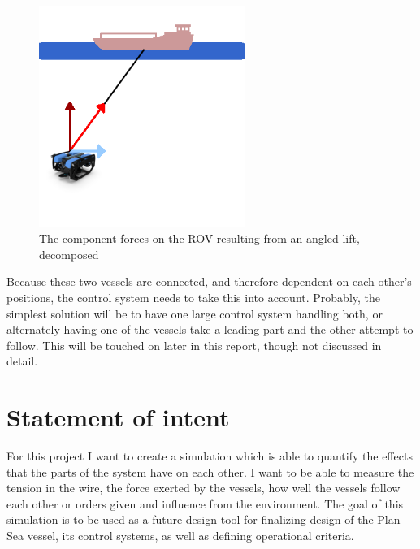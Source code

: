 \documentclass[class=article, crop=false]{standalone}
\begin{document}
\begin{figure}
	\centering
	\includegraphics[width=0.6\textwidth]{angled-component}
	\caption{The component forces on the ROV resulting from an angled lift, decomposed}
	\label{fig:angled-force}
\end{figure}

Because these two vessels are connected, and therefore dependent on each other's positions, the control system needs to take this into account. Probably, the simplest solution will be to have one large control system handling both, or alternately having one of the vessels take a leading part and the other attempt to follow. This will be touched on later in this report, though not discussed in detail.

\section{Statement of intent}
For this project I want to create a simulation which is able to quantify the effects that the parts of the system have on each other. I want to be able to measure the tension in the wire, the force exerted by the vessels, how well the vessels follow each other or orders given and influence from the environment. The goal of this simulation is to be used as a future design tool for finalizing design of the Plan Sea vessel, its control systems, as well as defining operational criteria. 
\end{document}
